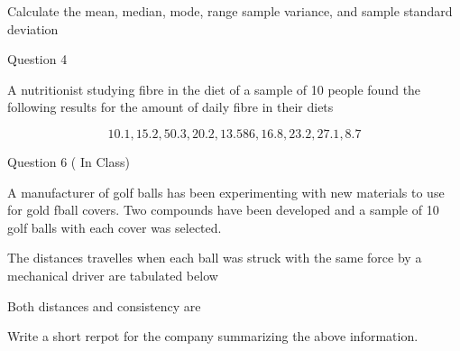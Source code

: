 Calculate the mean, median, mode, range sample variance, and sample standard deviation

Question 4

A nutritionist studying fibre in the diet of a sample of 10 people found the following results for the amount of daily fibre in their diets

\[10.1,15.2,50.3,20.2,13.586,16.8,23.2,27.1,8.7\]

Question 6 ( In Class) 

A manufacturer of golf balls has been experimenting with new materials to use for gold fball covers.
Two compounds have been developed and a sample of 10 golf balls with each cover was selected.

The distances travelles when each ball was struck with the same force by a mechanical driver are tabulated below

Both distances and consistency are 

Write a short rerpot for the company summarizing the above information.

